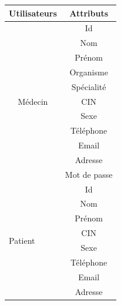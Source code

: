 







\begin{table}[h!]
\centering
\begin{tabular}{lc}
\hline
\multicolumn{1}{|c|}{Utilisateurs}            & \multicolumn{1}{c|}{Attributs} \\ \hline
\multicolumn{1}{c}{\multirow{11}{*}{Médecin}} & Id                             \\
\multicolumn{1}{c}{}                          & Nom                            \\
\multicolumn{1}{c}{}                          & Prénom                         \\
\multicolumn{1}{c}{}                          & Organisme                      \\
\multicolumn{1}{c}{}                          & Spécialité                     \\
\multicolumn{1}{c}{}                          & CIN                            \\
\multicolumn{1}{c}{}                          & Sexe                           \\
\multicolumn{1}{c}{}                          & Téléphone                      \\
\multicolumn{1}{c}{}                          & Email                          \\
\multicolumn{1}{c}{}                          & Adresse                        \\
\multicolumn{1}{c}{}                          & Mot de passe                   \\
\multirow{12}{*}{Patient}                     & Id                             \\
                                              & Nom                            \\
                                              & Prénom                         \\
                                              & CIN                            \\
                                              & Sexe                           \\
                                              & Téléphone                      \\
                                              & Email                          \\
                                              & Adresse                        \\

\end{tabular}
\end{table}
